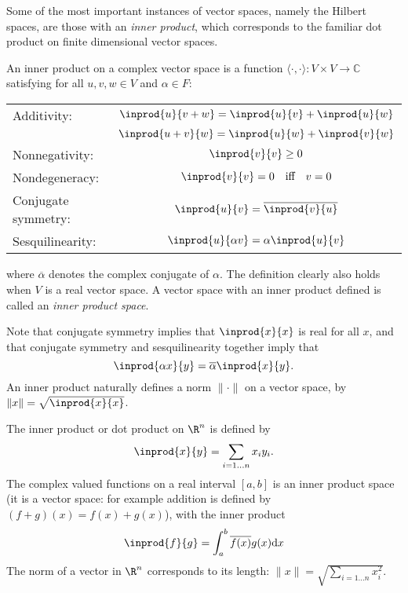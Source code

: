 Some of the most important instances of vector spaces, namely the Hilbert spaces, are those with an \emph{inner product}, which corresponds to the familiar dot product on finite dimensional vector spaces.
\begin{defn}
An inner product on a complex vector space is a function $\langle \cdot ,\cdot \rangle : V \times V \rightarrow \mathbb{C}$ satisfying for all $u,v,w \in V$ and $\alpha \in F$:
\begin{center}
\begin{tabular}{lc}
Additivity: &
$\inprod{u}{v+w}  =  \inprod{u}{v} + \inprod{u}{w}$\\
\vspace{0.1cm}
&$\inprod{u+v}{w}  =  \inprod{u}{w} + \inprod{v}{w}$\\
\vspace{0.1cm}
Nonnegativity: &
$\inprod{v}{v} \ge 0$\\
\vspace{0.1cm}
Nondegeneracy: &
$\inprod{v}{v} = 0\quad \textrm{iff}\quad  v = 0$\\
\vspace{0.1cm}
Conjugate symmetry: &
$\inprod{u}{v} = \overline{\inprod{v}{u}}$\\
\vspace{0.1cm}
Sesquilinearity: &
$ \inprod{u}{\alpha v} = \alpha\inprod{u}{v}$
\end{tabular}
\end{center}
where $\overline{\alpha}$ denotes the complex conjugate of $\alpha$. The definition clearly also holds when $V$ is a real vector space. A vector space with an inner product defined is called an \emph{inner product space}.

Note that conjugate symmetry implies that $\inprod{x}{x}$ is real for all $x$, and that conjugate symmetry and sesquilinearity together imply that
$$\inprod{\alpha x}{y} = \overline{\alpha}\inprod{x}{y}.$$
An inner product naturally defines a norm $\|\cdot\|$ on a vector space, by $\|x\| = \sqrt{\inprod{x}{x}}$.
\end{defn}

\begin{example}
The inner product or dot product on $\R^n$ is defined by
$$\inprod{x}{y}  = \sum_{i = 1\ldots n} x_iy_i.$$
The complex valued functions on a real interval $[a,b]$ is an inner product space (it is a vector space: for example addition is defined by $(f + g)(x) = f(x) + g(x)$), with the inner product
$$\inprod{f}{g} = \int_a^b \overline{f(x)}g(x) \mathrm{d}x$$
The norm of a vector in $\R^n$ corresponds to its length: $\|x\| = \sqrt{\sum_{i=1\ldots n} x_i^2}$.
\end{example}


